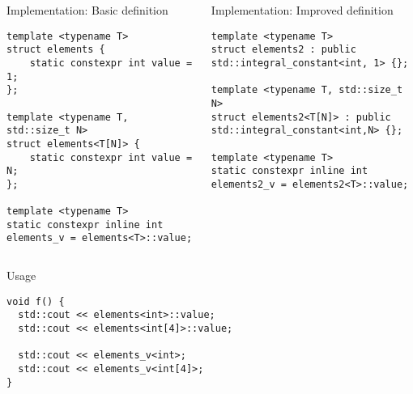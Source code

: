 \begin{frame}[t,fragile]

\begin{columns}[T]

\begin{block}{Implementation: Basic definition}
\begin{lstlisting}[basicstyle=\tiny]
template <typename T>
struct elements {
    static constexpr int value = 1;
};

template <typename T, std::size_t N>
struct elements<T[N]> {
    static constexpr int value = N;
};

template <typename T>
static constexpr inline int elements_v = elements<T>::value;
\end{lstlisting}
\end{block}

\pause
{}
\begin{block}{Implementation: Improved definition}
\begin{lstlisting}[basicstyle=\tiny]
template <typename T>
struct elements2 : public std::integral_constant<int, 1> {};

template <typename T, std::size_t N>
struct elements2<T[N]> : public std::integral_constant<int,N> {};

template <typename T>
static constexpr inline int elements2_v = elements2<T>::value;

\end{lstlisting}
\end{block}

\end{columns}

\pause
\begin{block}{Usage}
\begin{lstlisting}[basicstyle=\tiny]
void f() {
  std::cout << elements<int>::value;
  std::cout << elements<int[4]>::value;

  std::cout << elements_v<int>;
  std::cout << elements_v<int[4]>;
}
\end{lstlisting}
\end{block}

\end{frame}

